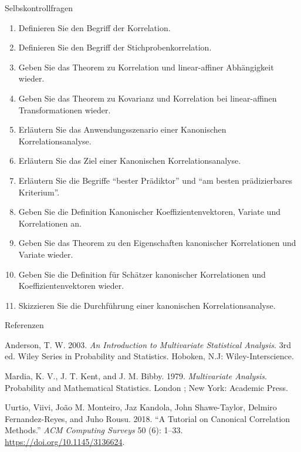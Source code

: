 \documentclass[
  8pt,
  ignorenonframetext,
]{beamer}
\providecommand{\tightlist}{%
  \setlength{\itemsep}{0pt}\setlength{\parskip}{0pt}}
\newlength{\cslhangindent}
\newlength{\cslentryspacingunit} %
\newenvironment{CSLReferences}[2] %
 {%
  \setlength{\parindent}{0pt}
  \ifodd #1
  \let\oldpar\par
  \def\par{\hangindent=\cslhangindent\oldpar}
  \fi
  \setlength{\parskip}{#2\cslentryspacingunit}
 }%
 {}
\begin{document}
\begin{frame}{Selbskontrollfragen}
\protect\hypertarget{selbskontrollfragen}{}
\footnotesize
{}

\begin{enumerate}
\tightlist
\item
  Definieren Sie den Begriff der Korrelation.
\item
  Definieren Sie den Begriff der Stichprobenkorrelation.
\item
  Geben Sie das Theorem zu Korrelation und linear-affiner Abhängigkeit
  wieder.
\item
  Geben Sie das Theorem zu Kovarianz und Korrelation bei linear-affinen
  Transformationen wieder.
\item
  Erläutern Sie das Anwendungsszenario einer Kanonischen
  Korrelationsanalyse.
\item
  Erläutern Sie das Ziel einer Kanonischen Korrelationsanalyse.
\item
  Erläutern Sie die Begriffe ``bester Prädiktor'' und ``am besten
  prädizierbares Kriterium''.
\item
  Geben Sie die Definition Kanonischer Koeffizientenvektoren, Variate
  und Korrelationen an.
\item
  Geben Sie das Theorem zu den Eigenschaften kanonischer Korrelationen
  und Variate wieder.
\item
  Geben Sie die Definition für Schätzer kanonischer Korrelationen und
  Koeffizientenvektoren wieder.
\item
  Skizzieren Sie die Durchführung einer kanonischen Korrelationsanalyse.
\end{enumerate}
\end{frame}

\begin{frame}{Referenzen}
\protect\hypertarget{referenzen}{}
\footnotesize

\hypertarget{refs}{}
\begin{CSLReferences}{1}{0}
\leavevmode{}%
Anderson, T. W. 2003. \emph{An Introduction to Multivariate Statistical
Analysis}. 3rd ed. Wiley Series in Probability and Statistics. {Hoboken,
N.J}: {Wiley-Interscience}.

\leavevmode{}%
Mardia, K. V., J. T. Kent, and J. M. Bibby. 1979. \emph{Multivariate
Analysis}. Probability and Mathematical Statistics. {London ; New York}:
{Academic Press}.

\leavevmode{}%
Uurtio, Viivi, João M. Monteiro, Jaz Kandola, John Shawe-Taylor, Delmiro
Fernandez-Reyes, and Juho Rousu. 2018. {``A {Tutorial} on {Canonical
Correlation Methods}.''} \emph{ACM Computing Surveys} 50 (6): 1--33.
\url{https://doi.org/10.1145/3136624}.

\end{CSLReferences}
\end{frame}
\end{document}
